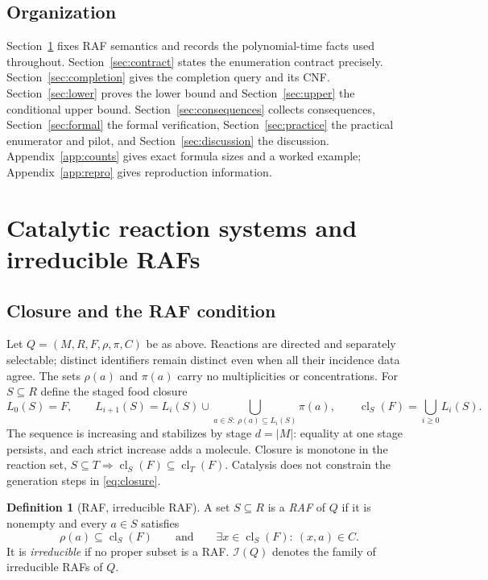 \documentclass[11pt,a4paper]{article}
\theoremstyle{plain}
\theoremstyle{definition}
\newtheorem{definition}[theorem]{Definition}
\theoremstyle{remark}
\newcommand{\Irr}{\mathcal I}
\newcommand{\cl}{\operatorname{cl}}
\begin{document}
\subsection{Organization}

Section~\ref{sec:defs} fixes RAF semantics and records the polynomial-time facts used throughout. Section~\ref{sec:contract} states the enumeration contract precisely. Section~\ref{sec:completion} gives the completion query and its CNF. Section~\ref{sec:lower} proves the lower bound and Section~\ref{sec:upper} the conditional upper bound. Section~\ref{sec:consequences} collects consequences, Section~\ref{sec:formal} the formal verification, Section~\ref{sec:practice} the practical enumerator and pilot, and Section~\ref{sec:discussion} the discussion. Appendix~\ref{app:counts} gives exact formula sizes and a worked example; Appendix~\ref{app:repro} gives reproduction information.

\section{Catalytic reaction systems and irreducible RAFs}\label{sec:defs}

\subsection{Closure and the RAF condition}

Let $Q=(M,R,F,\rho,\pi,C)$ be as above. Reactions are directed and separately selectable; distinct identifiers remain distinct even when all their incidence data agree. The sets $\rho(a)$ and $\pi(a)$ carry no multiplicities or concentrations. For $S\subseteq R$ define the staged food closure
\begin{equation}\label{eq:closure}
 L_0(S)=F,\qquad
 L_{i+1}(S)=L_i(S)\cup\bigcup_{a\in S:\ \rho(a)\subseteq L_i(S)}\pi(a),\qquad
 \cl_S(F)=\bigcup_{i\ge0}L_i(S).
\end{equation}
The sequence is increasing and stabilizes by stage $d=|M|$: equality at one stage persists, and each strict increase adds a molecule. Closure is monotone in the reaction set, $S\subseteq T\Rightarrow\cl_S(F)\subseteq\cl_T(F)$. Catalysis does not constrain the generation steps in \eqref{eq:closure}.

\begin{definition}[RAF, irreducible RAF]\label{def:raf}
A set $S\subseteq R$ is a \emph{RAF} of $Q$ if it is nonempty and every $a\in S$ satisfies
\[
 \rho(a)\subseteq\cl_S(F)\qquad\text{and}\qquad \exists x\in\cl_S(F):\ (x,a)\in C .
\]
It is \emph{irreducible} if no proper subset is a RAF. $\Irr(Q)$ denotes the family of irreducible RAFs of $Q$.
\end{definition}
\end{document}

